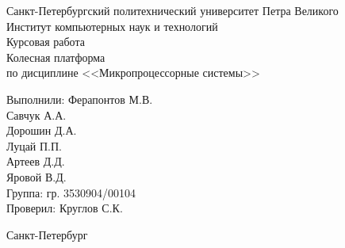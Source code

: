 \begin{titlepage}	%

	\begin{center}		%

		\large Санкт-Петербургский политехнический университет Петра Великого\\
		\large Институт компьютерных наук и технологий\\[6cm]

		\huge Курсовая работа\\[0.5cm] %
		\large Колесная платформа\\[0.1cm]
		\large по дисциплине <<Микропроцессорные системы>>\\[5cm]

	\end{center}

	\noindent\large Выполнили: \hfill \large Ферапонтов М.В.\\
	\hspace*{\fill} \large  Савчук А.А.\\
	\hspace*{\fill} \large Дорошин Д.А.\\
	\hspace*{\fill} \large Луцай П.П.\\
	\hspace*{\fill} \large Артеев Д.Д.\\
	\hspace*{\fill} \large Яровой В.Д.\\
	\noindent\large Группа: \hfill \large гр. 3530904/00104\\

	\noindent\large Проверил: \hfill \large Круглов С.К.

	\vfill %

	\begin{center}
		\large Санкт-Петербург\\
		\large \the\year %
	\end{center} %

\end{titlepage} %

\vfill %
